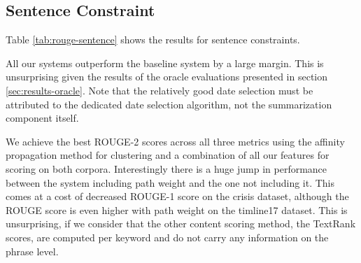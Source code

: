\documentclass[a4paper,BCOR=10mm]{report}
\numberwithin{lemma}{chapter}
\numberwithin{definition}{chapter}
\begin{document}

\subsection{Sentence Constraint}

Table \ref{tab:rouge-sentence} shows the results for sentence constraints.

All our systems outperform the baseline system by a large margin. This is unsurprising given the results of the oracle evaluations presented in section \ref{sec:results-oracle}. Note that the relatively good date selection must be attributed to the dedicated date selection algorithm, not the summarization component itself.

We achieve the best ROUGE-2 scores across all three metrics using the affinity propagation method for clustering and a combination of all our features for scoring on both corpora.
Interestingly there is a huge jump in performance between the system including path weight and 
the one not including it. This comes at a cost of decreased ROUGE-1 score on the crisis dataset, although the ROUGE score is even higher with path weight on the timline17 dataset. This is unsurprising, if we consider that the other content scoring method, the TextRank scores, are computed per keyword and do not carry any information on the phrase level.
\end{document}
